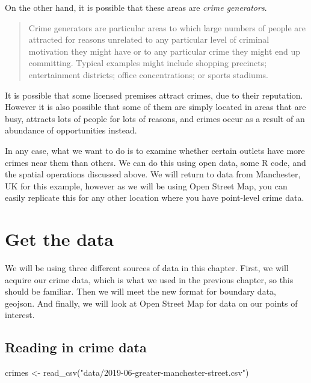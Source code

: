 \documentclass[
  krantz2]{krantz}
\makeatletter
\newenvironment{Shaded}{\begin{snugshade}}{\end{snugshade}}
\newcommand{\FunctionTok}[1]{\textcolor[rgb]{0,0,0}{#1}}
\newcommand{\NormalTok}[1]{#1}
\newcommand{\OtherTok}[1]{\textcolor[rgb]{0.37,0.37,0.37}{#1}}
\newcommand{\StringTok}[1]{\textcolor[rgb]{0.5,0.5,0.5}{#1}}
\newenvironment{kframe}{%
\medskip{}
\setlength{\fboxsep}{.8em}
 \def\at@end@of@kframe{}%
 \ifinner\ifhmode%
  \def\at@end@of@kframe{\end{minipage}}%
  \begin{minipage}{\columnwidth}%
 \fi\fi%
 \def\FrameCommand##1{\hskip\@totalleftmargin \hskip-\fboxsep
 \colorbox{shadecolor}{##1}\hskip-\fboxsep
     \hskip-\linewidth \hskip-\@totalleftmargin \hskip\columnwidth}%
 \MakeFramed {\advance\hsize-\width
   \@totalleftmargin\z@ \linewidth\hsize
   \@setminipage}}%
 {\par\unskip\endMakeFramed%
 \at@end@of@kframe}
\renewenvironment{Shaded}{\begin{kframe}}{\end{kframe}}
\makeatother
\begin{document}
On the other hand, it is possible that these areas are \emph{crime generators}.

\begin{quote}
Crime generators are particular areas to which large numbers of people are attracted for reasons unrelated to any particular level of criminal motivation they might have or to any particular crime they might end up committing. Typical examples might include shopping precincts; entertainment districts; office concentrations; or sports stadiums.
\end{quote}

It is possible that some licensed premises attract crimes, due to their reputation. However it is also possible that some of them are simply located in areas that are busy, attracts lots of people for lots of reasons, and crimes occur as a result of an abundance of opportunities instead.

In any case, what we want to do is to examine whether certain outlets have more crimes near them than others. We can do this using open data, some R code, and the spatial operations discussed above. We will return to data from Manchester, UK for this example, however as we will be using Open Street Map, you can easily replicate this for any other location where you have point-level crime data.

\hypertarget{get-the-data}{%
\section{Get the data}\label{get-the-data}}

We will be using three different sources of data in this chapter. First, we will acquire our crime data, which is what we used in the previous chapter, so this should be familiar. Then we will meet the new format for boundary data, geojson. And finally, we will look at Open Street Map for data on our points of interest.

\hypertarget{reading-in-crime-data}{%
\subsection{Reading in crime data}\label{reading-in-crime-data}}

\begin{Shaded}
\begin{Highlighting}[]
\NormalTok{crimes }\OtherTok{\textless{}{-}} \FunctionTok{read\_csv}\NormalTok{(}\StringTok{"data/2019{-}06{-}greater{-}manchester{-}street.csv"}\NormalTok{)}
\end{Highlighting}
\end{Shaded}
\end{document}
